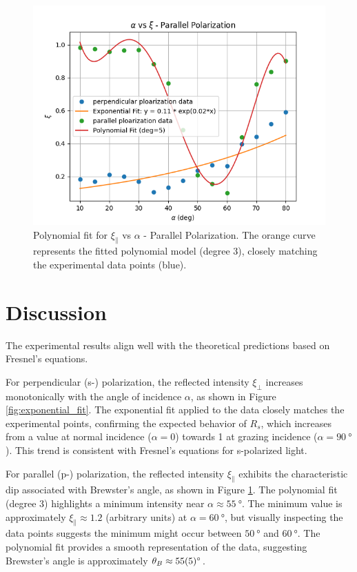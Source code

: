 \documentclass[journal]{IEEEtran}
\begin{document}
\begin{figure}[H]
    \centering
    \includegraphics[width=\linewidth]{../plots/polynomial_fit.png}
    \caption{Polynomial fit for $\xi_{\parallel}$ vs $\alpha$ - Parallel Polarization. The orange curve represents the fitted polynomial model (degree 3), closely matching the experimental data points (blue).}
    \label{fig:polynomial_fit}
\end{figure}
\section{Discussion}
The experimental results align well with the theoretical predictions based on Fresnel's equations.

For perpendicular (s-) polarization, the reflected intensity $\xi_{\perp}$ increases monotonically with the angle of incidence $\alpha$, as shown in Figure \ref{fig:exponential_fit}. The exponential fit applied to the data closely matches the experimental points, confirming the expected behavior of $R_s$, which increases from a value at normal incidence ($\alpha=0$) towards 1 at grazing incidence ($\alpha=\SI{90}{\degree}$). This trend is consistent with Fresnel's equations for s-polarized light.

For parallel (p-) polarization, the reflected intensity $\xi_{\parallel}$ exhibits the characteristic dip associated with Brewster's angle, as shown in Figure \ref{fig:polynomial_fit}. The polynomial fit (degree 3) highlights a minimum intensity near $\alpha \approx \SI{55}{\degree}$. The minimum value is approximately $\xi_{\parallel} \approx 1.2$ (arbitrary units) at $\alpha = \SI{60}{\degree}$, but visually inspecting the data points suggests the minimum might occur between $\SI{50}{\degree}$ and $\SI{60}{\degree}$. The polynomial fit provides a smooth representation of the data, suggesting Brewster's angle is approximately $\theta_B \approx \SI{55 \pm 5}{\degree}$.
\end{document}
